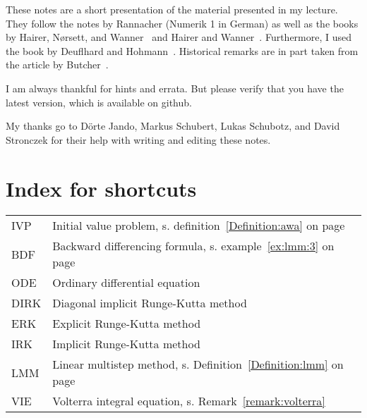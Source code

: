 These notes are a short presentation of the material presented in my
lecture. They follow the notes by Rannacher (Numerik 1 in German)
as well as the books by Hairer, Nørsett, and
Wanner~\cite{HairerNorsettWanner93} and Hairer and
Wanner~\cite{HairerWanner10}. Furthermore, I used the book by
Deuflhard and Hohmann~\cite{DeuflhardBornemann08}. Historical remarks
are in part taken from the article by Butcher~\cite{Butcher96}.

I am always thankful for hints and errata. But please verify that you
have the latest version, which is available on github.

My thanks go to Dörte Jando, Markus Schubert, Lukas Schubotz, and David Stronczek for their help
with writing and editing these notes.

\clearpage
\section*{Index for shortcuts}
\begin{tabular}{ll}
  IVP & Initial value problem, s. definition~\ref{Definition:awa} on page~\pageref{Definition:awa}\\
  BDF & Backward differencing formula, s. example~\ref{ex:lmm:3} on page~\pageref{ex:lmm:3}\\
  ODE & Ordinary differential equation\\
  DIRK & Diagonal implicit Runge-Kutta method\\
  ERK & Explicit Runge-Kutta method\\
  IRK & Implicit Runge-Kutta method\\
  LMM & Linear multistep method, s. Definition~\ref{Definition:lmm} on
  page~\pageref{ex:lmm:1}\\
  VIE & Volterra integral equation, s. Remark~\vref{remark:volterra}
\end{tabular}

